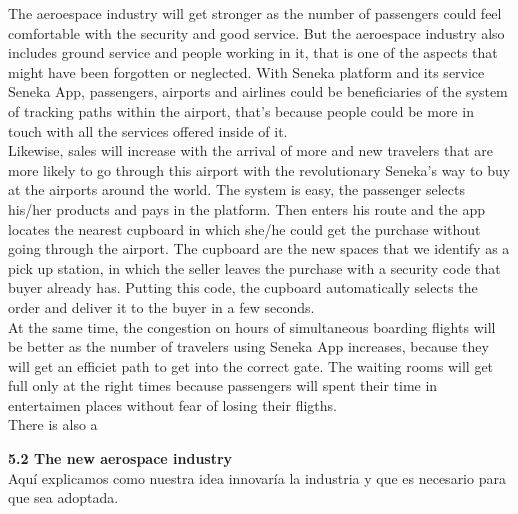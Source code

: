 \documentclass[]{article}
\begin{document}
The aeroespace industry will get stronger as the number of passengers could feel comfortable with the security and good service. But the aeroespace industry also includes ground service and people working in it, that is one of the aspects that might have been forgotten or neglected. With Seneka platform and its service Seneka App, passengers, airports and airlines could be beneficiaries of the system of tracking paths within the airport, that's because people could be more in touch with all the services offered inside of it.\\

Likewise, sales will increase with the arrival of more and new travelers that are more likely to go through this airport with the revolutionary Seneka's way to buy at the airports around the world. The system is easy, the passenger selects his/her products and pays in the platform. Then enters his route and the app locates the nearest cupboard in which she/he could get the purchase without going through the airport. The cupboard are the new spaces that we identify as a pick up station, in which the seller leaves the purchase with a security code that buyer already has. Putting this code, the cupboard automatically selects the order and deliver it to the buyer in a few seconds.\\

At the same time, the congestion on hours of simultaneous boarding flights will be better as the number of travelers using Seneka App increases, because they will get an efficiet path to get into the correct gate. The waiting rooms will get full only at the right times because passengers will spent their time in entertaimen places without fear of losing their fligths.\\

There is also a 

\Large{\textbf{5.2 The new aerospace industry}\\}
Aquí explicamos como nuestra idea innovaría la industria y que es necesario para que sea adoptada.
\end{document}
